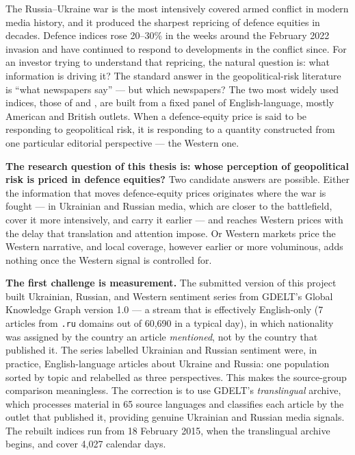 \documentclass[12pt,a4paper]{article}
\begin{document}
The Russia--Ukraine war is the most intensively covered armed conflict in modern media history, and it produced the sharpest repricing of defence equities in decades. Defence indices rose 20--30\% in the weeks around the February 2022 invasion and have continued to respond to developments in the conflict since. For an investor trying to understand that repricing, the natural question is: what information is driving it? The standard answer in the geopolitical-risk literature is ``what newspapers say'' --- but which newspapers? The two most widely used indices, those of \citet{caldara2022} and \citet{baker2016}, are built from a fixed panel of English-language, mostly American and British outlets. When a defence-equity price is said to be responding to geopolitical risk, it is responding to a quantity constructed from one particular editorial perspective --- the Western one.

\textbf{The research question of this thesis is: whose perception of geopolitical risk is priced in defence equities?} Two candidate answers are possible. Either the information that moves defence-equity prices originates where the war is fought --- in Ukrainian and Russian media, which are closer to the battlefield, cover it more intensively, and carry it earlier --- and reaches Western prices with the delay that translation and attention impose. Or Western markets price the Western narrative, and local coverage, however earlier or more voluminous, adds nothing once the Western signal is controlled for.

\textbf{The first challenge is measurement.} The submitted version of this project built Ukrainian, Russian, and Western sentiment series from GDELT's Global Knowledge Graph version 1.0 --- a stream that is effectively English-only (7 articles from \texttt{.ru} domains out of 60,690 in a typical day), in which nationality was assigned by the country an article \textit{mentioned}, not by the country that published it. The series labelled Ukrainian and Russian sentiment were, in practice, English-language articles about Ukraine and Russia: one population sorted by topic and relabelled as three perspectives. This makes the source-group comparison meaningless. The correction is to use GDELT's \textit{translingual} archive, which processes material in 65 source languages and classifies each article by the outlet that published it, providing genuine Ukrainian and Russian media signals. The rebuilt indices run from 18 February 2015, when the translingual archive begins, and cover 4,027 calendar days.
\end{document}
